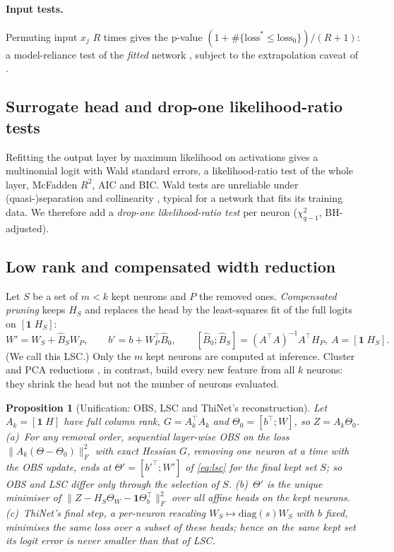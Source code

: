 \documentclass[11pt,a4paper]{article}
\newtheorem{proposition}{Proposition}
\theoremstyle{remark}\newtheorem{remark}{Remark}
\begin{document}
\paragraph{Input tests.} Permuting input $x_j$ $R$ times gives the p-value $(1+\#\{\text{loss}^*\le\text{loss}_0\})/(R+1)$: a model-reliance test of the \emph{fitted} network \cite{breiman2001,fisher2019}, subject to the extrapolation caveat of \cite{hooker2021}.

\subsection{Surrogate head and drop-one likelihood-ratio tests}
Refitting the output layer by maximum likelihood on activations gives a multinomial logit with Wald standard errors, a likelihood-ratio test of the whole layer, McFadden $R^2$, AIC and BIC. Wald tests are unreliable under (quasi-)separation and collinearity \cite{hauck1977,albert1984}, typical for a network that fits its training data. We therefore add a \emph{drop-one likelihood-ratio test} per neuron ($\chi^2_{q-1}$, BH-adjusted).

\subsection{Low rank and compensated width reduction}\label{sec:lsc}
Let $S$ be a set of $m<k$ kept neurons and $P$ the removed ones. \emph{Compensated pruning} keeps $H_S$ and replaces the head by the least-squares fit of the full logits on $[\mathbf 1\;H_S]$:
\begin{equation}\label{eq:lsc}
W'=W_S+\hat B_S W_P,\qquad b'=b+W_P^\top\hat B_0,\qquad [\hat B_0;\hat B_S]=(A^\top A)^{-1}A^\top H_P,\ A=[\mathbf 1\;H_S].
\end{equation}
(We call this LSC.) Only the $m$ kept neurons are computed at inference. Cluster and PCA reductions \cite{almohamad2024}, in contrast, build every new feature from all $k$ neurons: they shrink the head but not the number of neurons evaluated.

\begin{proposition}[Unification: OBS, LSC and ThiNet's reconstruction]\label{prop:equiv}
Let $A_k=[\mathbf 1\;H]$ have full column rank, $G=A_k^\top A_k$ and $\Theta_0=[b^\top;W]$, so $Z=A_k\Theta_0$. (a)~For any removal order, sequential layer-wise OBS on the loss $\|A_k(\Theta-\Theta_0)\|_F^2$ with exact Hessian $G$, removing one neuron at a time with the OBS update, ends at $\Theta'=[b'^\top;W']$ of \eqref{eq:lsc} for the final kept set $S$; so OBS and LSC differ only through the \emph{selection} of $S$. (b)~$\Theta'$ is the unique minimiser of $\|Z-H_S\Theta_W-\mathbf 1\Theta_b^\top\|_F^2$ over all affine heads on the kept neurons. (c)~ThiNet's final step, a per-neuron rescaling $W_S\mapsto\mathrm{diag}(s)W_S$ with $b$ fixed, minimises the same loss over a subset of these heads; hence on the same kept set its logit error is never smaller than that of LSC.
\end{proposition}
\end{document}
